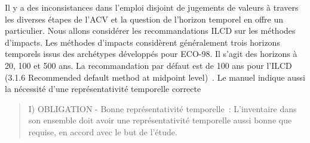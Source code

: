 Il y a des inconsistances dans l'emploi disjoint de jugements de valeurs à travers les diverses étapes de l'ACV et la question de l'horizon temporel en offre un particulier.
Nous allons considérer les recommandations ILCD sur les méthodes d'impacts.
Les méthodes d'impacts considèrent généralement trois horizons temporels issus des archétypes développés pour ECO-98.
Il s'agit des horizons à 20, 100 et 500 ans.
La recommandation par défaut est de 100 ans pour l'ILCD (3.1.6 Recommended default method at midpoint level)~\cite{jrc_ilcd_2011}.
Le manuel indique aussi la nécessité d'une représentativité temporelle correcte~\cite[6.8.4 Time-related representativeness]{european_commission_ilcd_2010}
\blockcquote{european_commission_ilcd_2010}{I) OBLIGATION - Bonne représentativité temporelle~: L'inventaire dans son ensemble doit avoir une représentativité temporelle aussi bonne que requise, en accord avec le but de l'étude.}

